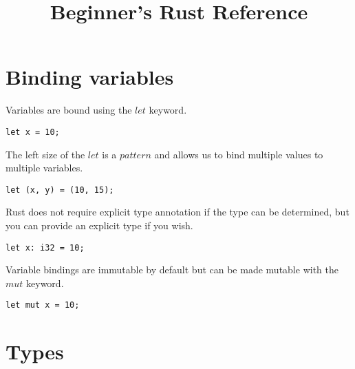 \documentclass[letterpaper,landscape]{article}
\title{Beginner's Rust Reference}
\begin{document}
\begin{multicols}{3}							%
\raggedcolumns							%

\section*{Binding variables}

Variables are bound using the $let$ keyword.

\begin{verbatim}
let x = 10;
\end{verbatim}

The left size of the $let$ is a $pattern$ and allows us to bind multiple values to multiple variables.

\begin{verbatim}
let (x, y) = (10, 15);
\end{verbatim}

Rust does not require explicit type annotation if the type can be determined, but you can provide an explicit type if you wish.

\begin{verbatim}
let x: i32 = 10;
\end{verbatim}

Variable bindings are immutable by default but can be made mutable with the $mut$ keyword.

\begin{verbatim}
let mut x = 10;
\end{verbatim}

\section*{Types}


\end{multicols}
\end{document}
